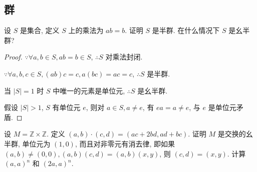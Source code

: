 \documentclass[color=black,device=normal,lang=cn,mode=geye]{elegantnote}
\begin{document}
\subsection{群}
\begin{exercisec}[5.1.1]
    设 $S$ 是集合, 定义 $S$ 上的乘法为 $ab=b$. 证明 $S$ 是半群. 在什么情况下 $S$ 是幺半群?
\end{exercisec}
\begin{proof}
    $\because\forall a,b\in S,ab=b\in S$, $\therefore S$ 对乘法封闭.

    $\because\forall a,b,c\in S,(ab)c=c,a(bc)=ac=c$, $\therefore S$ 是半群.

    当 $|S|=1$ 时 $S$ 中唯一的元素是单位元, $\therefore S$ 是幺半群.

    假设 $|S|>1$, $S$ 有单位元 $e$, 则对 $a\in S,a\neq e$, 有 $ea=a\neq e$, 与 $e$ 是单位元矛盾.
\end{proof}
\begin{exercisec}[5.1.2]
    设 $M=\mathbb{Z}\times\mathbb{Z}$. 定义 $(a,b)\cdot(c,d)=(ac+2bd,ad+bc)$. 证明 $M$ 是交换的幺半群, 单位元为 $(1,0)$, 而且对非零元有消去律, 即如果 $(a,b)\neq(0,0),(a,b)(c,d)=(a,b)(x,y)$, 则 $(c,d)=(x,y)$. 计算 $(a,a)^n$ 和 $(2a,a)^n$.
\end{exercisec}
\end{document}
